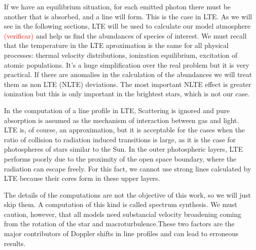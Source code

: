 \documentclass[dvips,12pt,a4paper]{report}
\begin{document}
{\indent If we have an equilibrium situation, for each emitted photon there must be another that is absorbed, and a line will form. This is the case in LTE. As we will see in the following sections, LTE will be used to calculate our model atmosphere \textcolor{red}{(verificar)} and help us find the abundances of species of interest. We must recall that the temperature in the LTE aproximation is the same for all physical processes: thermal velocity distributions, ionization equilibrium, excitation of atomic populations. It's a huge simplification over the real problem but it is very practical. If there are anomalies in the calculation of the abundances we will treat them as non LTE (NLTE) deviations. The most important NLTE effect is greater ionization but this is only important in the brightest stars, which is not our case.

In the computation of a line profile in LTE, Scattering is ignored and pure absorption is assumed as the mechanism of interaction between gas and light. LTE is, of course, an approximation, but it is acceptable for the cases when the ratio of collision to radiation induced transitions is large, as it is the case for photospheres of stars similar to the Sun. In the outer photospheric layers, LTE performs poorly due to the proximity of the open space boundary, where the radiation can escape freely. For this fact, we cannot use strong lines calculated by LTE because their cores form in these upper layers.

The details of the computations are not the objective of this work, so we will just skip them. A computation of this kind is called spectrum synthesis. %
We must caution, however, that all models need substancial velocity broadening coming from the rotation of the star and macroturbulence.These two factors are the major contributors of Doppler shifts in line profiles and can lead to erroneous results. 









}
\end{document}
